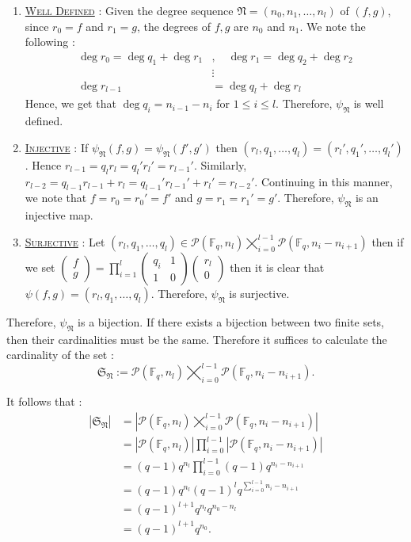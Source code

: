 \begin{enumerate}
    \item \underline{\textsc{Well Defined}} : Given the degree sequence $\mathfrak{N} = (n_0, n_1,\ldots, n_l)$ of $(f,g)$, since $r_0=f$ and $r_1 = g$, the degrees of $f,g$ are $n_0$ and $n_1$. We note the following :
\begin{align*}
    \deg{r_0} = \deg{q_1}+\deg{r_1} &, \quad \deg{r_1} = \deg{q_2}+\deg{r_2} \\
    &\vdots \\
    \deg{r_{l-1}} &= \deg{q_{l}}+\deg{r_l}
\end{align*}
Hence, we get that $\deg{q_i} = n_{i-1}-n_i$ for $1\leq i\leq l$. Therefore, $\psi_{\mathfrak{N}}$ is well defined.

\item \underline{\textsc{Injective}} : If $\psi_{\mathfrak{N}}(f, g) = \psi_{\mathfrak{N}}(f',g')$ then  $(r_l,q_1,\ldots, q_l) = (r_l', q_1',\ldots, q_l')$. Hence $r_{l-1}=q_l r_l = q_l' r_l' = r_{l-1}'$. Similarly, $r_{l-2}=q_{l-1}r_{l-1}+r_l = q_{l-1}'r_{l-1}'+r_l'=r_{l-2}'$. Continuing in this manner, we note that $f=r_0 = r_0'=f'$ and $g=r_1 = r_1'=g'$. Therefore, $\psi_{\mathfrak{N}}$ is an injective map.

\item \underline{\textsc{Surjective}} : Let $(r_l,q_1,\ldots, q_l)\in \mathscr{P}(\mathbb{F}_q, n_l)\bigtimes_{i=0}^{l-1} \mathscr{P}(\mathbb{F}_q, n_i-n_{i+1})$ then if we set $\begin{pmatrix}f \\ g\end{pmatrix} = \displaystyle\prod_{i=1}^l \begin{pmatrix}q_i & 1 \\ 1 & 0\end{pmatrix}\begin{pmatrix}r_l \\ 0\end{pmatrix}$ then it is clear that $\psi(f,g) = (r_l,q_1,\ldots, q_l)$. Therefore, $\psi_{\mathfrak{N}}$ is surjective.
\end{enumerate}
Therefore, $\psi_{\mathfrak{N}}$ is a bijection. If there exists a bijection between two finite sets, then their cardinalities must be the same. Therefore it suffices to calculate the cardinality of the set :
\[\mathfrak{S}_{\mathfrak{N}}:=\mathscr{P}(\mathbb{F}_q, n_l)\bigtimes_{i=0}^{l-1} \mathscr{P}(\mathbb{F}_q, n_i-n_{i+1}).\]

It follows that :
\begin{align*}
    |\mathfrak{S}_{\mathfrak{N}}| &= |\mathscr{P}(\mathbb{F}_q, n_l)\bigtimes_{i=0}^{l-1} \mathscr{P}(\mathbb{F}_q, n_i-n_{i+1})| \\
    &=|\mathscr{P}(\mathbb{F}_q, n_l)|\prod_{i=0}^{l-1}|\mathscr{P}(\mathbb{F}_q, n_i-n_{i+1})| \\
    &=(q-1)q^{n_l}\prod_{i=0}^{l-1}(q-1) q^{n_i-n_{i+1}} \\
    &=(q-1)q^{n_l}(q-1)^{l} q^{\sum_{i=0}^{l-1} n_i - n_{i+1}} \\
    &=(q-1)^{l+1}q^{n_l}q^{n_0-n_l} \\
    &=(q-1)^{l+1}q^{n_0}.
\end{align*}

